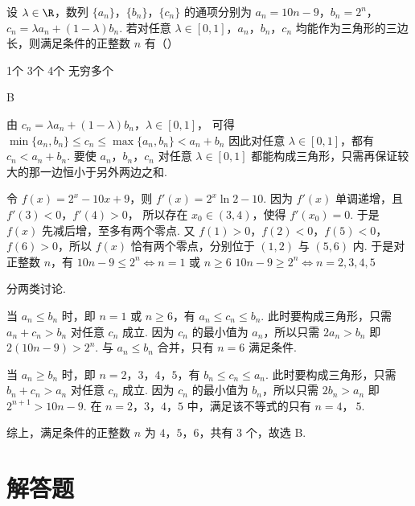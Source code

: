 \begin{problem}
设 \(\lambda\in\R\)，数列 \(\{a_n\}\)，\(\{b_n\}\)，\(\{c_n\}\) 的通项分别为 \(a_n=10n-9\)，\(b_n=2^n\)，\(c_n=\lambda a_n+(1-\lambda)b_n\). 若对任意 \(\lambda\in[0,1]\)，\(a_n\)，\(b_n\)，\(c_n\) 均能作为三角形的三边长，则满足条件的正整数 \(n\) 有（\quad）

\choices
    {1个}
    {3个}
    {4个}
    {无穷多个}
\end{problem}

\begin{answer}
B
\end{answer}

\begin{solution}
由
\(c_n=\lambda a_n+(1-\lambda)b_n\)，\(\lambda\in[0,1]\)，
可得
\(
\min\{a_n,b_n\}\le c_n\le \max\{a_n,b_n\}<a_n+b_n
\)
因此对任意 \(\lambda\in[0,1]\)，都有 \(c_n<a_n+b_n\).
要使 \(a_n\)，\(b_n\)，\(c_n\) 对任意 \(\lambda\in[0,1]\) 都能构成三角形，只需再保证较大的那一边恒小于另外两边之和.

令 \(f(x)=2^x-10x+9\)，则 \(f'(x)=2^x\ln2-10\). 因为 \(f'(x)\) 单调递增，且 \(f'(3)<0\)，\(f'(4)>0\)，
所以存在 \(x_0\in(3,4)\)，使得 \(f'(x_0)=0\). 于是 \(f(x)\) 先减后增，至多有两个零点.
又 \(f(1)>0\)，\(f(2)<0\)，\(f(5)<0\)，\(f(6)>0\)，所以 \(f(x)\) 恰有两个零点，分别位于 \((1,2)\) 与 \((5,6)\) 内. 于是对正整数 \(n\)，有
\(
10n-9\le 2^n \iff n=1 \text{\ 或\ } n\ge 6
\)
\(
10n-9\ge 2^n \iff n=2,3,4,5
\)

分两类讨论.

当 \(a_n\le b_n\) 时，即 \(n=1\) 或 \(n\ge 6\)，有 \(a_n\le c_n\le b_n\). 此时要构成三角形，只需 \(a_n+c_n>b_n\) 对任意 \(c_n\) 成立. 因为 \(c_n\) 的最小值为 \(a_n\)，所以只需
\(
2a_n>b_n
\)
即 \(2(10n-9)>2^n\). 与 \(a_n\le b_n\) 合并，只有 \(n=6\) 满足条件.

当 \(a_n\ge b_n\) 时，即 \(n=2\)，\(3\)，\(4\)，\(5\)，有 \(b_n\le c_n\le a_n\). 此时要构成三角形，只需 \(b_n+c_n>a_n\) 对任意 \(c_n\) 成立. 因为 \(c_n\) 的最小值为 \(b_n\)，所以只需
\(
2b_n>a_n
\)
即 \(2^{n+1}>10n-9\). 在 \(n=2\)，\(3\)，\(4\)，\(5\) 中，满足该不等式的只有 \(n=4\)，\(\ 5\).

综上，满足条件的正整数 \(n\) 为 \(4\)，\(5\)，\(6\)，共有 \(3\) 个，故选 B.
\end{solution}

\section{解答题}

